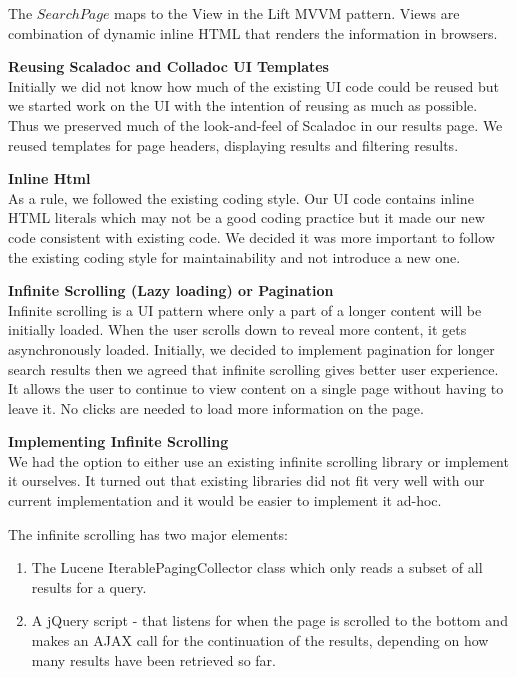 The $SearchPage$ maps to the View in the Lift MVVM pattern. Views are combination of dynamic inline HTML that renders the information in browsers. 

\textbf{Reusing Scaladoc and Colladoc UI Templates}\\
Initially we did not know how much of the existing UI code could be reused but we started work on the UI with the intention of reusing as much as possible. Thus we preserved much of the look-and-feel of Scaladoc in our results page. We reused templates for page headers, displaying results and filtering results. 

\textbf{Inline Html}\\
As a rule, we followed the existing coding style. Our UI code contains inline HTML literals which may not be a good coding practice but it made our new code consistent with existing code. We decided it was more important to follow the existing coding style for maintainability and not introduce a new one.

\textbf{Infinite Scrolling (Lazy loading) or Pagination}\\
Infinite scrolling is a UI pattern where only a part of a longer content will be initially loaded. When the user scrolls down to reveal more content, it gets asynchronously loaded. Initially, we decided to implement pagination for longer search results then we agreed that infinite scrolling gives better user experience. It allows the user to continue to view content on a single page without having to leave it. No clicks are needed to load more information on the page.

\textbf{Implementing Infinite Scrolling}\\
We had the option to either use an existing infinite scrolling library or implement it ourselves. It turned out that existing libraries did not fit very well with our current implementation and it would be easier to implement it ad-hoc.

The infinite scrolling has two major elements:
\begin{enumerate}
\item The Lucene IterablePagingCollector class which only reads a subset of all results for a query.
\item A jQuery script - that listens for when the page is scrolled to the bottom and makes an AJAX call for the continuation of the results, depending on how many results have been retrieved so far.
\end{enumerate}
